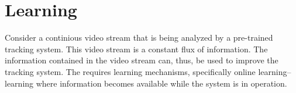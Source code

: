 \section{Learning}
  Consider a continious video stream that is being analyzed by a pre-trained tracking system.
  This video stream is a constant flux of information.
  The information contained in the video stream can, thus, be used to improve the tracking system.
  The requires learning mechanisms, specifically online learning--learning where information becomes available while the system is in operation.
  
  
  
